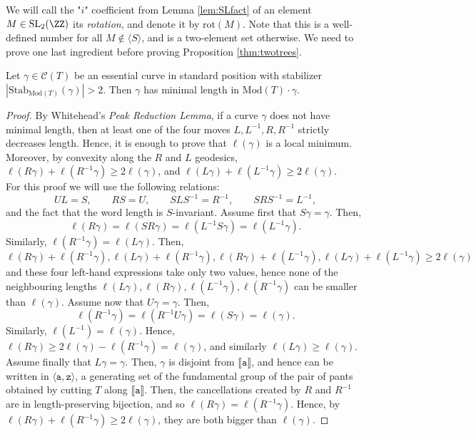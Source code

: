 \documentclass{article}
\newcommand{\SL}{\mathrm{SL}}
\begin{document}
	We will call the "$i$" coefficient from Lemma \ref{lem:SLfact} of an element $M\in \SL_2(\ZZ)$ its \emph{rotation}, and denote it by $\mathrm{rot}(M)$. Note that this is a well-defined number for all $M\notin \langle S \rangle$, and is a two-element set otherwise. We need to prove one last ingredient before proving Proposition \ref{thm:twotrees}.

    \begin{lemma} Let $\gamma\in\mathcal{C}(T)$ be an essential curve in standard position with stabilizer $|\mathrm{Stab}_{\mathrm{Mod}(T)}(\gamma)|>2$. Then $\gamma$ has minimal length in $\mathrm{Mod}(T)\cdot \gamma$.   
    \end{lemma}
    \begin{proof}
        By Whitehead's \emph{Peak Reduction Lemma}, if a curve $\gamma$ does not have minimal length, then at least one of the four moves $L,L^{-1},R,R^{-1}$ strictly decreases length. Hence, it is enough to prove that $\ell(\gamma)$ is a local minimum. Moreover, by convexity along the $R$ and $L$ geodesics, $\ell(R\gamma)+\ell(R^{-1}\gamma)\geq 2\ell(\gamma)$, and $\ell(L\gamma)+\ell(L^{-1}\gamma)\geq 2\ell(\gamma)$.\\
        For this proof we will use the following relations: 
        \[
        UL=S,\qquad RS=U,\qquad SLS^{-1}=R^{-1},\qquad SRS^{-1}=L^{-1},
        \]
        and the fact that the word length is $S$-invariant. 
        Assume first that $S\gamma=\gamma$. Then, 
        \[
        \ell(R\gamma)=\ell(SR\gamma)=\ell(L^{-1}S\gamma)=\ell(L^{-1}\gamma).
        \]
        Similarly, $\ell(R^{-1}\gamma)=\ell(L\gamma)$. Then, \[\ell(R\gamma)+\ell(R^{-1}\gamma), \ell(L\gamma)+\ell(R^{-1}\gamma), \ell(R\gamma)+\ell(L^{-1}\gamma), \ell(L\gamma)+\ell(L^{-1}\gamma)\geq 2\ell(\gamma)\] and these four left-hand expressions take only two values, hence none of the neighbouring lengths  $\ell(L\gamma),\ell(R\gamma),\ell(L^{-1}\gamma),\ell(R^{-1}\gamma)$ can be smaller than $\ell(\gamma)$. Assume now that $U\gamma=\gamma$. Then, 
        \[
        \ell(R^{-1}\gamma)=\ell(R^{-1}U\gamma)=\ell(S\gamma)=\ell(\gamma).
        \]
        Similarly, $\ell(L^{-1})=\ell(\gamma).$ Hence, $\ell(R\gamma)\geq 2\ell(\gamma)-\ell(R^{-1}\gamma)=\ell(\gamma)$,
        and similarly $\ell(L\gamma)\geq\ell(\gamma)$. Assume finally that $L\gamma=\gamma$. Then, $\gamma$ is disjoint from $\llbracket\mathtt{a}\rrbracket$, and hence can be written in $\langle \mathtt{a},\mathtt{z}\rangle$, a generating set of the fundamental group of the pair of pants obtained by cutting $T$ along $\llbracket\mathtt{a}\rrbracket$. Then, the cancellations created by $R$ and $R^{-1}$ are in length-preserving bijection, and so $\ell(R\gamma)=\ell(R^{-1}\gamma)$. Hence, by $\ell(R\gamma)+\ell(R^{-1}\gamma)\geq 2\ell(\gamma)$, they are both bigger than $\ell(\gamma)$.
    \end{proof}
    
\end{document}
